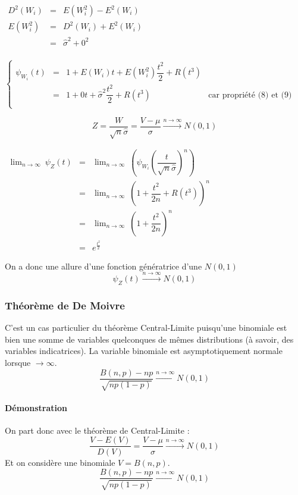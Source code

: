 \begin{center}
$\boxed{\begin{array}{LCL}
D^2(W_i) &=& E(W_i^2) - E^2(W_i)\\
E(W_i^2) &=& D^2(W_i) + E^2(W_i)\\
         &=& \widehat{\sigma}^2 + 0^2\\
\end{array}}$
\end{center}
\begin{center}
$\left\{\begin{array}{LCLC}
\psi_{W_i}(t) &=& 1 + E ( W_i ) t + E (W_i^2) \dfrac{t^2}{2}+R(t^3)\\
              &=& 1 + 0 t + \widehat{\sigma}^2 \dfrac{t^2}{2} + R(t^3)&\text{car propriété (8) et (9)}\\
\end{array}\right.$
\end{center}
$$\boxed{Z = \dfrac{W}{\sqrt{n}\widehat{\sigma}} = \dfrac{V-\mu}{\sigma} \stackrel{n\rightarrow\infty}{\rightarrow} N(0,1)}$$
\begin{center}
$\begin{array}{LCL}
\lim_{n\rightarrow\infty}\ \psi_{Z}(t) &=& \lim_{n\rightarrow\infty}\ \left( \psi_{W_i} \left( \dfrac{t}{\sqrt{n}\widehat{\sigma}} \right)^n \right) \\[0.3cm]
            &=& \lim_{n\rightarrow\infty}\ \left( 1 + \dfrac{t^2}{2n} + R(t^3) \right)^n\\
            &=& \lim_{n\rightarrow\infty}\ \left( 1 + \dfrac{t^2}{2n} \right)^n\\
            &=& e^{\frac{t^2}{2}}
\end{array}$
\end{center}
On a donc une allure d'une fonction génératrice d'une $N(0,1)$
$$\boxed{\psi_{Z}(t) \stackrel{n\rightarrow\infty}{\rightarrow} N(0,1)}$$









\newpage
\subsubsection{Théorème de De Moivre}
C'est un cas particulier du théorème Central-Limite puisqu'une binomiale est bien une somme de variables quelconques de mêmes distributions (à savoir, des variables indicatrices). La variable binomiale est asymptotiquement normale lorsque $\rightarrow\infty$.
$$\boxed{\dfrac{B(n,p)-np}{\sqrt{np(1-p)}} \stackrel{n\rightarrow\infty}{\rightarrow} N(0,1)}$$
\paragraph{Démonstration}
On part donc avec le théorème de Central-Limite :
$$\dfrac{V-E(V)}{D(V)} = \dfrac{V-\mu}{\sigma} \stackrel{n\rightarrow\infty}{\rightarrow} N(0,1)$$
Et on considère une binomiale $V = B(n,p)$.
$$\boxed{\dfrac{B(n,p)-np}{\sqrt{np(1-p)}} \stackrel{n\rightarrow\infty}{\rightarrow} N(0,1)}$$

